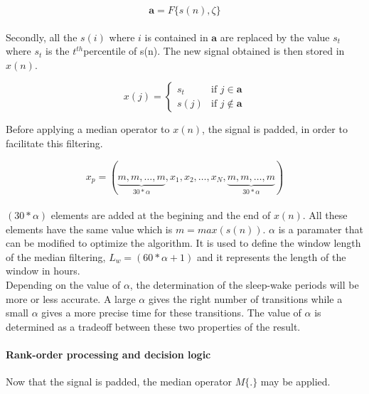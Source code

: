 \documentclass[a4paper,12pt]{article}
\begin{document}
\begin{equation}
\mathbf{a} = F\{s(n), \zeta\}
\end{equation}

\paragraph{}
Secondly, all the $s(i)$ where $i$ is contained in $\mathbf{a}$ are replaced by the value $s_t$ where $s_t$ is the $t^{th}$percentile of s(n). The new signal obtained is then stored in $x(n)$.

\begin{equation}
x(j) = \left\{
    \begin{array}{ll}
        s_t & \mbox{if } j \in \mathbf{a} \\
        s(j) & \mbox{if } j \notin \mathbf{a}
    \end{array}
\right.
\end{equation}

Before applying a median operator to $x(n)$, the signal is padded, in order to facilitate this filtering. 

\begin{equation}
\label{padding}
x_p = (\underbrace{m, m, \ldots, m}_{30 * \alpha}, x_1, x_2, \ldots, x_N, \underbrace{m, m, \ldots, m}_{30 * \alpha})
\end{equation}

\paragraph{}
$(30 * \alpha)$ elements are added at the begining and the end of $x(n)$. All these elements have the same value which is $m = max(s(n))$. $\alpha$ is a paramater that can be modified to optimize the algorithm. It is used to define the window length of the median filtering, $L_w = (60 * \alpha + 1)$ and it represents the length of the window in hours. \\

Depending on the value of $\alpha$, the determination of the sleep-wake periods will be more or less accurate. A large $\alpha$ gives the right number of transitions while a small $\alpha$ gives a more precise time for these transitions. The value of $\alpha$ is determined as a tradeoff between these two properties of the result.


\paragraph{Rank-order processing and decision logic\\}
Now that the signal is padded, the median operator $M\{.\}$ may be applied.
\end{document}
